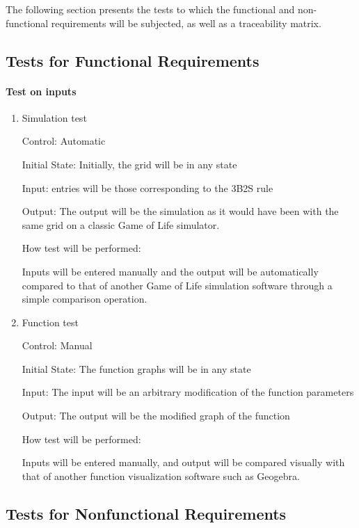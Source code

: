 \documentclass[12pt, titlepage]{article}
\begin{document}
The following section presents the tests to which the functional and non-functional requirements will be subjected, as well as a traceability matrix.

\subsection{Tests for Functional Requirements}
		
\paragraph{Test on inputs}

\begin{enumerate}

\item{Simulation test\\}

Control: Automatic
					
Initial State: Initially, the grid will be in any state
					
Input: entries will be those corresponding to the 3B2S rule
					
Output: The output will be the simulation as it would have been with the same grid on a classic Game of Life simulator.

How test will be performed:

Inputs will be entered manually and the output will be automatically compared to that of another Game of Life simulation software through a simple comparison operation.

\item{Function test\\}

Control: Manual
					
Initial State: The function graphs will be in any state

Input: The input will be an arbitrary modification of the function parameters
					
Output: The output will be the modified graph of the function

How test will be performed:

Inputs will be entered manually, and output will be compared visually with that of another function visualization software such as Geogebra.

\end{enumerate}

\subsection{Tests for Nonfunctional Requirements}
		
\end{document}
